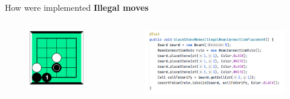 \documentclass{beamer}
\begin{document}
\begin{frame}[t]{How were implemented}
	\textbf{Illegal moves}
		\begin{columns}
		\begin{figure}[t]
			\includegraphics[scale=0.2]{images/illegal-move.png}
		\end{figure}
		\begin{figure}
			\includegraphics[scale=0.2]{images/test-illegal-weak.png}
		\end{figure}
		
	\end{columns}
	

	
	
\end{frame}
\end{document}
